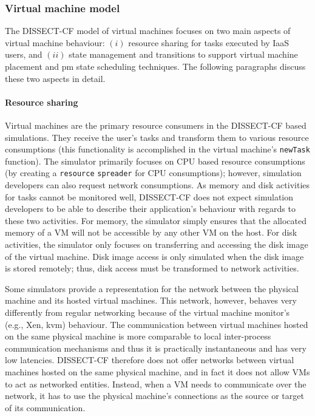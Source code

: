 \documentclass[sort, compress, 5p]{elsarticle}
\begin{document}
\subsubsection{Virtual machine model}

The DISSECT-CF model of virtual machines focuses on two main aspects of virtual machine behaviour: $(i)$ resource sharing for tasks executed by IaaS users, and $(ii)$ state management and transitions to support virtual machine placement and pm state scheduling techniques. The following paragraphs discuss these two aspects in detail.

\paragraph{Resource sharing} Virtual machines are the primary resource consumers in the DISSECT-CF based simulations. They receive the user's tasks and transform them to various resource consumptions (this functionality is accomplished in the virtual machine's \verb+newTask+ function). The simulator primarily focuses on CPU based resource consumptions (by creating a \verb+resource+ \verb+spreader+ for CPU consumptions); however, simulation developers can also request network consumptions. As memory and disk activities for tasks cannot be monitored well, DISSECT-CF does not expect simulation developers to be able to describe their application's behaviour with regards to these two activities. For memory, the simulator simply ensures that the allocated memory of a VM will not be accessible by any other VM on the host. For disk activities, the simulator only focuses on transferring and accessing the disk image of the virtual machine. Disk image access is only simulated when the disk image is stored remotely; thus, disk access must be transformed to network activities.

Some simulators provide a representation for the network between the physical machine and its hosted virtual machines. This network, however, behaves very differently from regular networking because of the virtual machine monitor's (e.g., Xen, kvm) behaviour. The communication between virtual machines hosted on the same physical machine is more comparable to local inter-process communication mechanisms and thus it is practically instantaneous and has very low latencies. DISSECT-CF therefore does not offer networks between virtual machines hosted on the same physical machine, and in fact it does not allow VMs to act as networked entities. Instead, when a VM needs to communicate over the network, it has to use the physical machine's connections as the source or target of its communication.
\end{document}
